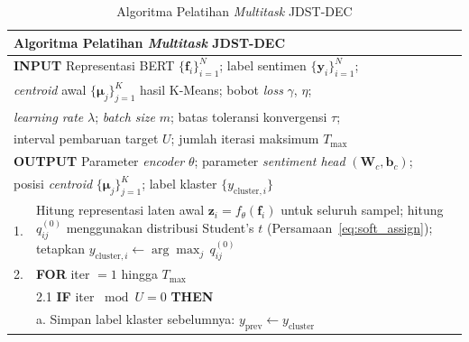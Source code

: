 \begin{table}[H]
\centering
\caption{Algoritma Pelatihan \textit{Multitask} JDST-DEC}
\label{tab:alg_jstdec}
\begin{tabular}{p{} p{}}
\hline
\multicolumn{2}{l}{\textbf{Algoritma} Pelatihan \textit{Multitask} JDST-DEC} \\
\hline
\multicolumn{2}{l}{\textbf{INPUT} \hspace{1.2em}
    Representasi BERT $\{\mathbf{f}_i\}_{i=1}^{N}$; label sentimen
    $\{\mathbf{y}_i\}_{i=1}^{N}$;} \\
\multicolumn{2}{l}{\hspace{4.7em}
    \textit{centroid} awal $\{\boldsymbol{\mu}_j\}_{j=1}^{K}$
    hasil K-Means; bobot \textit{loss} $\gamma$, $\eta$;} \\
\multicolumn{2}{l}{\hspace{4.7em}
    \textit{learning rate} $\lambda$; \textit{batch size} $m$;
    batas toleransi konvergensi $\tau$;} \\
\multicolumn{2}{l}{\hspace{4.7em}
    interval pembaruan target $U$; jumlah iterasi maksimum $T_{\max}$} \\[2pt]
\multicolumn{2}{l}{\textbf{OUTPUT} \hspace{0.5em}
    Parameter \textit{encoder} $\theta$; parameter \textit{sentiment head}
    $(\mathbf{W}_c, \mathbf{b}_c)$;} \\
\multicolumn{2}{l}{\hspace{4.7em}
    posisi \textit{centroid} $\{\boldsymbol{\mu}_j\}_{j=1}^{K}$;
    label klaster $\{y_{\text{cluster},i}\}$} \\
\hline
1. & Hitung representasi laten awal $\mathbf{z}_i = f_\theta(\mathbf{f}_i)$
     untuk seluruh sampel; hitung $q_{ij}^{(0)}$ menggunakan distribusi
     Student's $t$ (Persamaan~\ref{eq:soft_assign}); tetapkan
     $y_{\text{cluster},i} \leftarrow \arg\max_j\, q_{ij}^{(0)}$ \\[3pt]
2. & \textbf{FOR} iter $= 1$ hingga $T_{\max}$ \\[3pt]
   & \hspace{1em} 2.1 \hspace{0.5em}
     \textbf{IF} iter $\bmod U = 0$ \textbf{THEN} \\[3pt]
   & \hspace{2em} a. \hspace{0.5em}
     Simpan label klaster sebelumnya:
     $y_{\text{prev}} \leftarrow y_{\text{cluster}}$ \\[3pt]

\end{tabular}
\end{table}
